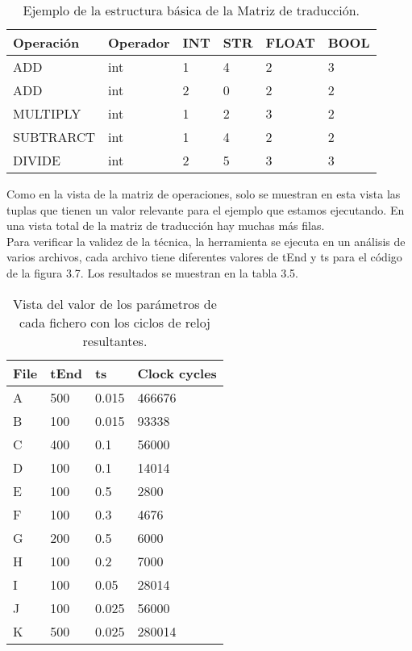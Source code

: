 \begin{table}[H]
\begin{center}
\begin{tabular}{|l|l|l|l|l|l|}
\hline
Operación & Operador & INT & STR & FLOAT & BOOL \\
\hline \hline
ADD & int & 1 & 4 & 2 & 3 \\ \hline
ADD & int & 2 & 0 & 2 & 2 \\ \hline
MULTIPLY & int & 1 & 2 & 3 & 2 \\ \hline
SUBTRARCT & int & 1 & 4 & 2 & 2 \\ \hline
DIVIDE & int & 2 & 5 & 3 & 3 \\ \hline
\end{tabular}
\caption{Ejemplo de la estructura básica de la Matriz de traducción.}
\end{center}
\end{table}



Como en la vista de la matriz de operaciones, solo se muestran en esta vista las tuplas que tienen un valor relevante para el ejemplo que estamos ejecutando. En una vista total de la matriz de traducción hay muchas más filas.\\


Para verificar la validez de la técnica, la herramienta se ejecuta en un análisis de varios archivos, cada archivo tiene diferentes valores de tEnd y ts para el código de la figura 3.7. Los resultados se muestran en la tabla 3.5.\\

\begin{table}[H]
\begin{center}
\begin{tabular}{|l|l|l|l|}
\hline
File & tEnd & ts & Clock cycles \\
\hline \hline
A & 500 & 0.015 & 466676\\ \hline
B & 100 & 0.015 & 93338\\ \hline
C & 400 & 0.1 & 56000\\ \hline
D & 100 & 0.1 & 14014\\ \hline
E & 100 & 0.5 & 2800\\ \hline
F & 100 & 0.3 & 4676\\ \hline
G & 200 & 0.5 & 6000\\ \hline
H & 100 & 0.2 & 7000\\ \hline
I & 100 & 0.05 & 28014\\ \hline
J & 100 & 0.025 & 56000\\ \hline
K & 500 & 0.025 & 280014\\ \hline
\end{tabular}
\caption{Vista del valor de los parámetros de cada fichero con los ciclos de reloj resultantes.}
\end{center}
\end{table}



